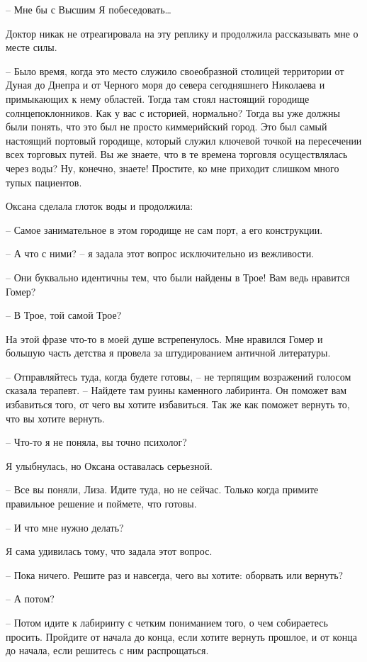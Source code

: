 \documentclass[
]{book}
\begin{document}
-- Мне бы с Высшим Я побеседовать\ldots{}

Доктор никак не отреагировала на эту реплику и продолжила рассказывать мне о месте силы.

-- Было время, когда это место служило своеобразной столицей территории от Дуная до Днепра и от Черного моря до севера сегодняшнего Николаева и примыкающих к нему областей. Тогда там стоял настоящий городище солнцепоклонников. Как у вас с историей, нормально? Тогда вы уже должны были понять, что это был не просто киммерийский город. Это был самый настоящий портовый городище, который служил ключевой точкой на пересечении всех торговых путей. Вы же знаете, что в те времена торговля осуществлялась через воды? Ну, конечно, знаете! Простите, ко мне приходит слишком много тупых пациентов.

Оксана сделала глоток воды и продолжила:

-- Самое занимательное в этом городище не сам порт, а его конструкции.

-- А что с ними? -- я задала этот вопрос исключительно из вежливости.

-- Они буквально идентичны тем, что были найдены в Трое! Вам ведь нравится Гомер?

-- В Трое, той самой Трое?

На этой фразе что-то в моей душе встрепенулось. Мне нравился Гомер и большую часть детства я провела за штудированием античной литературы.

-- Отправляйтесь туда, когда будете готовы, -- не терпящим возражений голосом сказала терапевт. -- Найдете там руины каменного лабиринта. Он поможет вам избавиться того, от чего вы хотите избавиться. Так же как поможет вернуть то, что вы хотите вернуть.

-- Что-то я не поняла, вы точно психолог?

Я улыбнулась, но Оксана оставалась серьезной.

-- Все вы поняли, Лиза. Идите туда, но не сейчас. Только когда примите правильное решение и поймете, что готовы.

-- И что мне нужно делать?

Я сама удивилась тому, что задала этот вопрос.

-- Пока ничего. Решите раз и навсегда, чего вы хотите: оборвать или вернуть?

-- А потом?

-- Потом идите к лабиринту с четким пониманием того, о чем собираетесь просить. Пройдите от начала до конца, если хотите вернуть прошлое, и от конца до начала, если решитесь с ним распрощаться.
\end{document}

